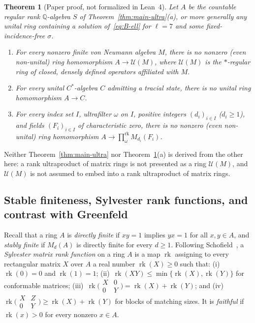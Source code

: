\documentclass[11pt]{article}
\newtheorem{theorem}{Theorem}[section]
\theoremstyle{definition}
\theoremstyle{remark}
\numberwithin{equation}{section}
\DeclareMathOperator{\rk}{rk}
\newcommand{\RUF}[3]{\prod_{#1}^{\mathrm{rk}} M_{#2}(#3)}
\newcommand{\Q}{\mathbb{Q}}
\newcommand{\U}{\mathcal{U}}
\newcommand{\1}{\mathbf{1}}
\begin{document}
\begin{theorem}[Paper proof, not formalized in Lean~4]
\label{thm:vn-main}
Let $A$ be the countable regular rank $\Q$-algebra $S$ of Theorem~\ref{thm:main-ultra}\textup{(a)}, or more generally any unital ring containing a solution of~\eqref{eq:B-ell} for $\ell = 7$ and some fixed-incidence-free $\sigma$.
\begin{enumerate}[label=\textup{(\alph*)},leftmargin=2.2em]
\item For every nonzero finite von Neumann algebra $M$, there is no nonzero (even non-unital) ring homomorphism $A \to \U(M)$, where $\U(M)$ is the $*$-regular ring of closed, densely defined operators affiliated with $M$.
\item For every unital $C^*$-algebra $C$ admitting a tracial state, there is no unital ring homomorphism $A \to C$.
\item For every index set $I$, ultrafilter $\omega$ on $I$, positive integers $(d_i)_{i \in I}$ ($d_i \ge 1$), and fields $(F_i)_{i \in I}$ of characteristic zero, there is no nonzero (even non-unital) ring homomorphism $A \to \RUF{\omega}{d_i}{F_i}$.
\end{enumerate}
\end{theorem}

Neither Theorem~\ref{thm:main-ultra} nor Theorem~\ref{thm:vn-main}(a) is derived from the other here: a rank ultraproduct of matrix rings is not presented as a ring $\U(M)$, and $\U(M)$ is not assumed to embed into a rank ultraproduct of matrix rings.

\subsection{Stable finiteness, Sylvester rank functions, and contrast with Greenfeld}

Recall that a ring $A$ is \emph{directly finite} if $xy = 1$ implies $yx = 1$ for all $x, y \in A$, and \emph{stably finite} if $M_d(A)$ is directly finite for every $d \ge 1$. Following Schofield~\cite[Chapter~7]{Schofield1985}, a \emph{Sylvester matrix rank function} on a ring $A$ is a map $\rk$ assigning to every rectangular matrix $X$ over $A$ a real number $\rk(X) \ge 0$ such that: (i)~$\rk(0) = 0$ and $\rk(1) = 1$; (ii)~$\rk(XY) \le \min\{\rk(X), \rk(Y)\}$ for conformable matrices; (iii)~$\rk\bigl(\begin{smallmatrix} X & 0 \\ 0 & Y \end{smallmatrix}\bigr) = \rk(X) + \rk(Y)$; and (iv)~$\rk\bigl(\begin{smallmatrix} X & Z \\ 0 & Y \end{smallmatrix}\bigr) \ge \rk(X) + \rk(Y)$ for blocks of matching sizes. It is \emph{faithful} if $\rk(x) > 0$ for every nonzero $x \in A$.
\end{document}
